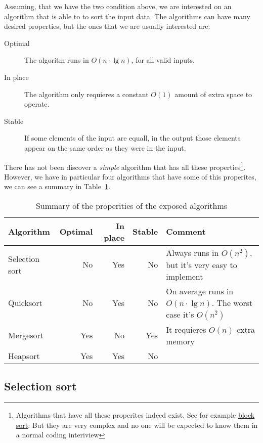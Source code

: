 Assuming, that we have the two condition above, we are interested on an algorithm that is able to to sort the input data. 
The algorithms can have many desired properties, but the ones that we are usually interested are:

\begin{description}
 \item[Optimal] The algoritm runs in $O(n \cdot \lg n)$, for all valid inputs.
 \item[In place] The algorithm only requieres a constant $O(1)$ amount of extra space to operate.
 \item[Stable] If some elements of the input are equall, in the output those elements appear on the same order as they were in the input.
\end{description}

There has not been discover a \emph{simple} algorithm that has all these properties\footnote{Algorithms that have all these properites indeed exist. See for example \href{https://en.wikipedia.org/wiki/Block_sort}{block sort}. But they are very complex and no one will be expected to know them in a normal coding interiview}.
However, we have in particular four algorithms that have some of this properites, we can see a summary in Table~\ref{tab:sorting}.

\begin{table}[htb]
  \begin{center}
    \begin{tabular}{l | r r r | l}
      Algorithm & Optimal & In place & Stable & Comment\\
      \midrule
      Selection sort & No & Yes & No & Always runs in $O(n^2)$, but it's very easy to implement\\
      Quicksort & No & Yes & No & On average runs in $O(n \cdot \lg n)$. The worst case it's $O(n^2)$ \\
      Mergesort & Yes & No & Yes & It requieres $O(n)$ extra memory\\
      Heapsort & Yes & Yes & No & \\
    \end{tabular}
  \end{center}
\caption{Summary of the properities of the exposed algorithms}
\label{tab:sorting}
\end{table}

\subsection{Selection sort}

